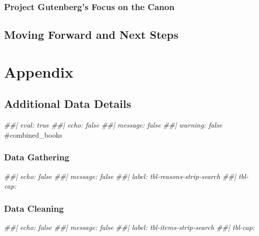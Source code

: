 \documentclass[
  letterpaper,
  DIV=11,
  numbers=noendperiod]{scrartcl}
\newenvironment{Shaded}{\begin{snugshade}}{\end{snugshade}}
\newcommand{\CommentTok}[1]{\textcolor[rgb]{0.37,0.37,0.37}{#1}}
\newcommand{\DocumentationTok}[1]{\textcolor[rgb]{0.37,0.37,0.37}{\textit{#1}}}
\begin{document}
\subsubsection{Project Gutenberg's Focus on the
Canon}\label{project-gutenbergs-focus-on-the-canon}

\subsection{Moving Forward and Next
Steps}\label{moving-forward-and-next-steps}

\newpage

\section{Appendix}\label{appendix}

\subsection{Additional Data Details}\label{additional-data-details}

\begin{Shaded}
\begin{Highlighting}[]
\DocumentationTok{\#\#| eval: true}
\DocumentationTok{\#\#| echo: false}
\DocumentationTok{\#\#| message: false}
\DocumentationTok{\#\#| warning: false}
\CommentTok{\#combined\_books }
\end{Highlighting}
\end{Shaded}

\subsubsection{Data Gathering}\label{data-gathering}

\begin{Shaded}
\begin{Highlighting}[]
\DocumentationTok{\#\#| echo: false}
\DocumentationTok{\#\#| message: false}
\DocumentationTok{\#\#| label: tbl{-}reasons{-}strip{-}search}
\DocumentationTok{\#\#| tbl{-}cap:}
\end{Highlighting}
\end{Shaded}

\subsubsection{Data Cleaning}\label{data-cleaning}

\begin{Shaded}
\begin{Highlighting}[]
\DocumentationTok{\#\#| echo: false}
\DocumentationTok{\#\#| message: false}
\DocumentationTok{\#\#| label: tbl{-}items{-}strip{-}search}
\DocumentationTok{\#\#| tbl{-}cap: }
\end{Highlighting}
\end{Shaded}
\end{document}
